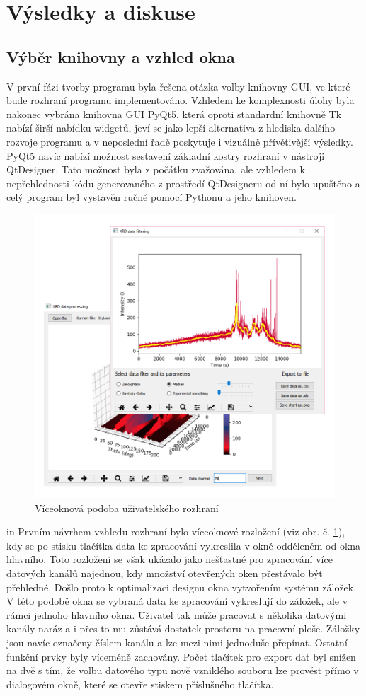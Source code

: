 \documentclass[a4paper, 12pt]{article}
\begin{document}
\newpage

\section{Výsledky a diskuse} \label{sec:diskuze}
\subsection{Výběr knihovny a vzhled okna}
V první fázi tvorby programu byla řešena otázka volby knihovny GUI, ve které bude rozhraní programu implementováno. Vzhledem ke komplexnosti úlohy byla nakonec vybrána knihovna GUI PyQt5, která oproti standardní knihovně Tk nabízí širší nabídku widgetů, jeví se jako lepší alternativa z hlediska dalšího rozvoje programu a v neposlední řadě poskytuje i vizuálně přívětivější výsledky.
PyQt5 navíc nabízí možnost sestavení základní kostry rozhraní v nástroji QtDesigner. Tato možnost byla z počátku zvažována, ale vzhledem k nepřehlednosti kódu generovaného z prostředí QtDesigneru od ní bylo upuštěno a celý program byl vystavěn ručně pomocí Pythonu a jeho knihoven.
\begin{figure}[h!]
 \centering
 \includegraphics[width=0.85\linewidth]{oldwin.png}
 \caption{Víceoknová podoba uživatelského rozhraní}
 \label{fig:oldwin}
\end{figure}
 in
\noindent Prvním návrhem vzhledu rozhraní bylo víceoknové rozložení (viz obr. č. \ref{fig:oldwin}), kdy se po stisku tlačítka  data ke zpracování vykreslila v okně odděleném od okna hlavního. Toto rozložení se však ukázalo jako nešťastné pro zpracování více datových kanálů najednou, kdy množství otevřených oken přestávalo být přehledné. Došlo proto k optimalizaci designu okna vytvořením systému záložek. V této podobě okna se vybraná data ke zpracování vykreslují do záložek, ale v rámci jednoho hlavního okna. Uživatel tak může pracovat s několika datovými kanály naráz a i přes to mu zůstává dostatek prostoru na pracovní ploše. Záložky jsou navíc označeny číslem kanálu a lze mezi nimi jednoduše přepínat. Ostatní funkční prvky byly víceméně zachovány. Počet tlačítek pro export dat byl snížen na dvě s tím, že volbu datového typu nově vzniklého souboru lze provést přímo v dialogovém okně, které se otevře stiskem příslušného tlačítka.
\end{document}
